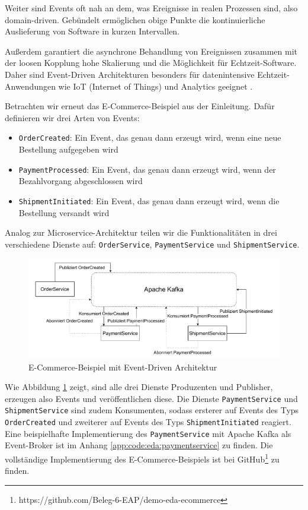 \documentclass[acmtog]{acmart}
\begin{document}
Weiter sind Events oft nah an dem, was Ereignisse in realen Prozessen sind, also domain-driven.
Gebündelt ermöglichen obige Punkte die kontinuierliche Auslieferung von Software in kurzen Intervallen.

Außerdem garantiert die asynchrone Behandlung von Ereignissen zusammen mit der loosen Kopplung hohe Skalierung und die Möglichkeit für Echtzeit-Software.
Daher sind Event-Driven Architekturen besonders für datenintensive Echtzeit-Anwendungen wie IoT (Internet of Things) und Analytics geeignet \cite{iotEda}.

Betrachten wir erneut das E-Commerce-Beispiel aus der Einleitung.
Dafür definieren wir drei Arten von Events:
\begin{itemize}
  \item \texttt{OrderCreated}: Ein Event, das genau dann erzeugt wird, wenn eine neue Bestellung aufgegeben wird
  \item \texttt{PaymentProcessed}: Ein Event, das genau dann erzeugt wird, wenn der Bezahlvorgang abgeschlossen wird
  \item \texttt{ShipmentInitiated}: Ein Event, das genau dann erzeugt wird, wenn die Bestellung versandt wird
\end{itemize}

Analog zur Microservice-Architektur teilen wir die Funktionalitäten in drei verschiedene Dienste auf: \texttt{OrderService}, \texttt{PaymentService} und \texttt{ShipmentService}.

\begin{figure}[!h]
  \centering
  \includegraphics[width=\linewidth]{images/eda/eda-ecommerce.drawio}
  \caption{E-Commerce-Beispiel mit Event-Driven Architektur}
  \label{fig:edaecommerce}
\end{figure}
Wie Abbildung \ref{fig:edaecommerce} zeigt, sind alle drei Dienste Produzenten und Publisher, erzeugen also Events und veröffentlichen diese.
Die Dienste \texttt{PaymentService} und \texttt{ShipmentService} sind zudem Konsumenten,
sodass ersterer auf Events des Typs \texttt{OrderCreated} und zweiterer auf Events des Typs \texttt{ShipmentInitiated} reagiert.
Eine beispielhafte Implementierung des \texttt{PaymentService} mit Apache Kafka als Event-Broker ist im Anhang \ref{app:code:eda:paymentservice} zu finden.
Die vollständige Implementierung des E-Commerce-Beispiels ist bei GitHub\footnote{https://github.com/Beleg-6-EAP/demo-eda-ecommerce} zu finden.
\end{document}
